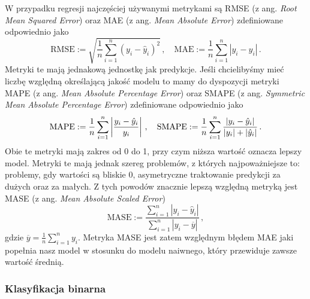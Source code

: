 \documentclass{myclass}
\numberwithin{equation}{section}
\begin{document}
W przypadku regresji najczęściej używanymi metrykami są RMSE (z ang. \textit{Root Mean Squared
Error}) oraz MAE (z ang. \textit{Mean Absolute Error}) zdefiniowane odpowiednio jako
\begin{equation}
    \mathrm{RMSE} := \sqrt{\frac{1}{n}\sum_{i=1}^n (y_i - \hat{y}_i)^2}\,,\quad\mathrm{MAE} := \frac{1}{n}\sum_{i=1}^n|y_i - \hat{y}_i|\,.
\end{equation}
Metryki te mają jednakową jednostkę jak predykcje. Jeśli chcielibyśmy mieć liczbę względną
określającą jakość modelu to mamy do dyspozycji metryki MAPE (z ang. \textit{Mean Absolute
Percentage Error}) oraz SMAPE (z ang. \textit{Symmetric Mean Absolute Percentage Error})
zdefiniowane odpowiednio jako
\begin{equation}
    \mathrm{MAPE} := \frac{1}{n}\sum_{i=1}^n\left|\frac{y_i - \hat{y}_i}{y_i}\right|\,,\quad\mathrm{SMAPE} := \frac{1}{n}\sum_{i=1}^n \frac{|y_i - \hat{y}_i|}{|y_i| + |\hat{y}_i|}\,.\\
\end{equation}
Obie te metryki mają zakres od 0 do 1, przy czym niższa wartość oznacza lepszy model. Metryki te
mają jednak szereg problemów, z których najpoważniejsze to: problemy, gdy wartości są bliskie 0,
asymetryczne traktowanie predykcji za dużych oraz za małych. Z tych powodów znacznie lepszą względną
metryką jest MASE (z ang. \textit{Mean Absolute Scaled Error})
\begin{equation}
    \mathrm{MASE} := \frac{\sum_{i=1}^n |y_i - \hat{y}_i|}{\sum_{i=1}^n |y_i - \overline{y}|}\,,
\end{equation}
gdzie \(\overline{y} = \frac{1}{n}\sum_{i=1}^n y_i\). Metryka MASE jest zatem względnym błędem MAE
jaki popełnia nasz model w stosunku do modelu naiwnego, który przewiduje zawsze wartość średnią.


\subsubsection{Klasyfikacja binarna}
\end{document}
